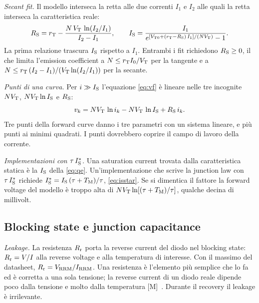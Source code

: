 \documentclass[10pt,a4paper]{scrartcl}
\let\newcommand\pdvaluedefine
\newcommand{\TM}{T_\mathrm{M}}
\newcommand{\IS}{I_\mathrm{S}}
\newcommand{\RS}{R_\mathrm{S}}
\newcommand{\Rr}{R_\mathrm{r}}
\newcommand{\VT}{V_\mathrm{T}}
\newcommand{\VTo}{V_\mathrm{T0}}
\newcommand{\rT}{r_\mathrm{T}}
\newcommand{\Vrrm}{V_\mathrm{RRM}}
\newcommand{\Irrm}{I_\mathrm{RRM}}
\newcommand{\Nem}{N}                          %
\begin{document}
\emph{Secant fit.} Il modello interseca la retta alle due correnti $I_1$ e $I_2$ alle quali la retta interseca la caratteristica reale:
\begin{equation}
\RS = \rT - \frac{\Nem\,\VT\,\ln(I_2/I_1)}{I_2 - I_1} , \qquad \IS = \frac{I_1}{e^{[\VTo + (\rT-\RS)\,I_1]/(\Nem\VT)} - 1} .
\label{eq:secant}
\end{equation}
La prima relazione trascura $\IS$ rispetto a $I_1$. Entrambi i fit richiedono $\RS \geq 0$, il che limita l'emission coefficient a $\Nem \leq \rT I_0/\VT$ per la tangente e a $\Nem \leq \rT\,(I_2-I_1)/(\VT\ln(I_2/I_1))$ per la secante.

\emph{Punti di una curva.} Per $i \gg \IS$ l'equazione \eqref{eq:vf} è lineare nelle tre incognite $\Nem\VT$, $\Nem\VT\ln\IS$ e $\RS$:
\begin{equation}
v_k = \Nem\VT\,\ln i_k - \Nem\VT\,\ln\IS + \RS\, i_k .
\label{eq:points}
\end{equation}
Tre punti della forward curve danno i tre parametri con un sistema lineare, e più punti ai minimi quadrati. I punti dovrebbero coprire il campo di lavoro della corrente.

\emph{Implementazioni con $\tau\,\IS^{*}$.} Una saturation current trovata dalla caratteristica statica è la $\IS$ della \eqref{eq:qe}. Un'implementazione che scrive la junction law con $\tau\,\IS^{*}$ richiede $\IS^{*} = \IS\,(\tau+\TM)/\tau$, \eqref{eq:isstar}. Se si dimentica il fattore la forward voltage del modello è troppo alta di $\Nem\VT\ln[(\tau+\TM)/\tau]$, qualche decina di millivolt.

\subsection{Blocking state e junction capacitance}
\label{sec:blocking}
\emph{Leakage.} La resistenza $\Rr$ porta la reverse current del diodo nel blocking state: $\Rr = V/I$ alla reverse voltage e alla temperatura di interesse. Con il massimo del datasheet, $\Rr = \Vrrm/\Irrm$. Una resistenza è l'elemento più semplice che lo fa ed è corretta a una sola tensione; la reverse current di un diodo reale dipende poco dalla tensione e molto dalla temperatura [M]~\cite{lutz}. Durante il recovery il leakage è irrilevante.
\end{document}
